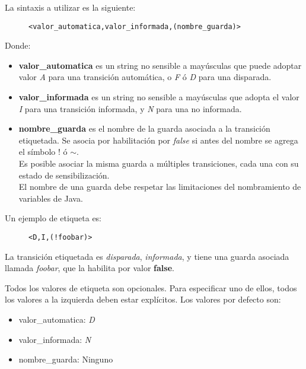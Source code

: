 La sintaxis a utilizar es la siguiente:

\begin{figure}[H]
\centering
\begin{verbatim}
<valor_automatica,valor_informada,(nombre_guarda)>
\end{verbatim}
\end{figure}

Donde:
\begin{itemize}
    \item \textbf{valor\_automatica} es un string no sensible a mayúsculas que
    puede adoptar valor \textit{A} para una transición automática, o
    \textit{F} ó \textit{D} para una disparada.
    \item \textbf{valor\_informada} es un string no sensible a mayúsculas que
    adopta el valor \textit{I} para una transición informada, y \textit{N} para
    una no informada.
    \item \textbf{nombre\_guarda} es el nombre de la guarda asociada a la
    transición etiquetada. Se asocia por habilitación por \textit{false}
    si antes del nombre se agrega el símbolo $!$ ó $\mathtt{\sim}$.\\
    Es posible asociar la misma guarda a múltiples transiciones, cada una con
    su estado de sensibilización.\\
    El nombre de una guarda debe respetar las limitaciones del nombramiento de
    variables de Java.
\end{itemize}

Un ejemplo de etiqueta es:

\begin{figure}[H]
\centering
\begin{verbatim}
<D,I,(!foobar)>
\end{verbatim}
\end{figure}

La transición etiquetada es \textit{disparada}, \textit{informada}, y tiene una
guarda asociada llamada \textit{foobar}, que la habilita por valor \textbf{false}.

Todos los valores de etiqueta son opcionales. Para especificar uno de ellos,
todos los valores a la izquierda deben estar explícitos. Los valores por defecto
son:
\begin{itemize}
    \item valor\_automatica: \textit{D}
    \item valor\_informada: \textit{N}
    \item nombre\_guarda: Ninguno
\end{itemize}

